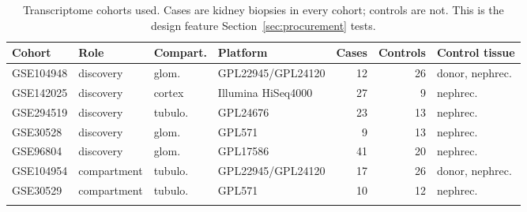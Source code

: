 \begin{table}[h]
\caption{Transcriptome cohorts used. Cases are kidney biopsies in every cohort; controls are not. This is the design feature Section~\ref{sec:procurement} tests.}\label{tab:cohorts}
\footnotesize
\setlength{\tabcolsep}{4pt}
\begin{tabular}{@{}llllrrl@{}}
\toprule
Cohort & Role & Compart. & Platform & Cases & Controls & Control tissue \\
\midrule
GSE104948 & discovery & glom. & GPL22945/GPL24120 & 12 & 26 & donor, nephrec. \\
GSE142025 & discovery & cortex & Illumina HiSeq4000 & 27 & 9 & nephrec. \\
GSE294519 & discovery & tubulo. & GPL24676 & 23 & 13 & nephrec. \\
GSE30528 & discovery & glom. & GPL571 & 9 & 13 & nephrec. \\
GSE96804 & discovery & glom. & GPL17586 & 41 & 20 & nephrec. \\
GSE104954 & compartment & tubulo. & GPL22945/GPL24120 & 17 & 26 & donor, nephrec. \\
GSE30529 & compartment & tubulo. & GPL571 & 10 & 12 & nephrec. \\
\botrule
\end{tabular}
\end{table}
